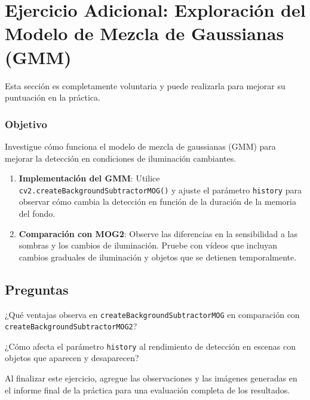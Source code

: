 \chapter{Ejercicio Adicional: \textbf{Exploración del Modelo de Mezcla de Gaussianas (GMM)}}
\label{chapter:tarea_d}

Esta sección es completamente voluntaria y puede realizarla para mejorar su puntuación en la práctica.

\subsection*{Objetivo}
Investigue cómo funciona el modelo de mezcla de gaussianas (GMM) para mejorar la detección en condiciones de iluminación cambiantes.

\begin{enumerate}
    \item \textbf{Implementación del GMM}: Utilice \texttt{cv2.createBackgroundSubtractorMOG()} y ajuste el parámetro \texttt{history} para observar cómo cambia la detección en función de la duración de la memoria del fondo.
    \item \textbf{Comparación con MOG2}: Observe las diferencias en la sensibilidad a las sombras y los cambios de iluminación. Pruebe con vídeos que incluyan cambios graduales de iluminación y objetos que se detienen temporalmente.
\end{enumerate}

\section*{Preguntas}

\vspace{5mm}
\begin{tcolorbox}[colback=gray!10, colframe=gray!30, coltitle=black, title=Pregunta D.1, halign=left]
¿Qué ventajas observa en \texttt{createBackgroundSubtractorMOG} en comparación con \texttt{createBackgroundSubtractorMOG2}?
\end{tcolorbox}

\vspace{5mm}
\begin{tcolorbox}[colback=gray!10, colframe=gray!30, coltitle=black, title=Pregunta D.2, halign=left]
¿Cómo afecta el parámetro \texttt{history} al rendimiento de detección en escenas con objetos que aparecen y desaparecen?

\vspace{3mm}
Al finalizar este ejercicio, agregue las observaciones y las imágenes generadas en el informe final de la práctica para una evaluación completa de los resultados.
\end{tcolorbox}